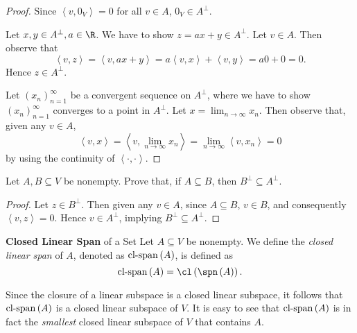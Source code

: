 \documentclass[pmath450]{subfiles}
\begin{document}
    \begin{proof}
        Since $\left\langle v, 0_V\right\rangle= 0$ for all $v\in A$, $0_V\in A^{\perp}$.

        Let $x,y\in A^{\perp}, a\in\R$. We have to show $z=ax+y\in A^{\perp}$. Let $v\in A$. Then observe that
        \begin{equation*}
            \left\langle v, z\right\rangle = \left\langle v, ax+y\right\rangle = a\left\langle v, x\right\rangle+\left\langle v, y\right\rangle = a0+0 = 0.
        \end{equation*}
        Hence $z\in A^{\perp}$.

        Let $\left( x_{n} \right)^{\infty}_{n=1}$ be a convergent sequence on $A^{\perp}$, where we have to show $\left( x_{n} \right)^{\infty}_{n=1}$ converges to a point in $A^{\perp}$. Let $x=\lim_{n\to\infty}x_n$. Then observe that, given any $v\in A$,
        \begin{equation*}
            \left\langle v, x\right\rangle = \left\langle v, \lim_{n\to\infty}x_n\right\rangle = \lim_{n\to\infty}\left\langle v, x_n\right\rangle = 0
        \end{equation*}
        by using the continuity of $\left\langle \cdot, \cdot\right\rangle$.
    \end{proof}

    \begin{exercise}{}
        Let $A,B\subseteq V$ be nonempty. Prove that, if $A\subseteq B$, then $B^{\perp}\subseteq A^{\perp}$.
    \end{exercise}
    
    \begin{proof}
        Let $z\in B^{\perp}$. Then given any $v\in A$, since $A\subseteq B$, $v\in B$, and consequently $\left\langle v, z\right\rangle=0$. Hence $v\in A^{\perp}$, implying $B^{\perp}\subseteq A^{\perp}$.
    \end{proof}
    
    \begin{definition}{\textbf{Closed Linear Span} of a Set}
        Let $A\subseteq V$ be nonempty. We define the \emph{closed linear span} of $A$, denoted as $\operatorname{cl-span}\left( A \right)$, is defined as
        \begin{equation*}
            \clspn\left( A \right) = \cl\left( \spn\left( A \right) \right).
        \end{equation*}
    \end{definition}

    \np Since the closure of a linear subspace is a closed linear subspace, it follows that $\operatorname{cl-span}\left( A \right)$ is a closed linear subspace of $V$. It is easy to see that $\operatorname{cl-span}\left( A \right)$ is in fact the \textit{smallest} closed linear subspace of $V$ that contains $A$.
    
\end{document}
